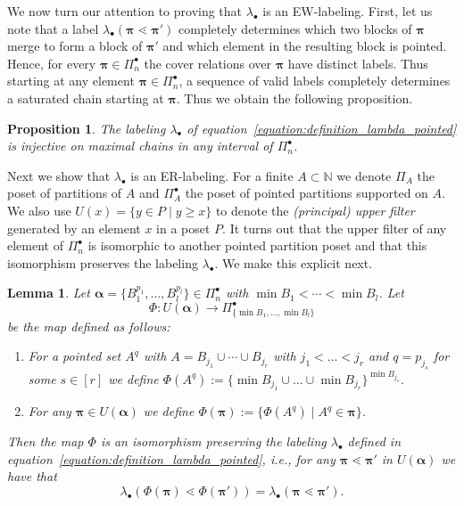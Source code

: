 \documentclass[11pt]{article}
\newtheorem{lemma}[theo]{Lemma}
\newtheorem{prop}[theo]{Proposition}
\theoremstyle{definition}
\numberwithin{equation}{section}
\newcommand{\NN}{\mathbb{N}}
\newcommand{\bpi}{\pmb{\pi}}
\newcommand{\balpha}{\pmb{\alpha}}
\begin{document}
 
  We now turn our attention to proving that $\lambda_\bullet$ is an EW-labeling.  First, let us note that a label $\lambda_{\bullet}(\bpi \lessdot \bpi')$ completely determines which two blocks of $\bpi$ merge to form a block of $\bpi'$ and which element in the resulting block is pointed. Hence, for every $\bpi\in \Pi_n^{\bullet}$ the cover relations over $\bpi$ have distinct labels. Thus starting at any element $\bpi \in \Pi_n^{\bullet}$, a sequence of valid labels completely determines a saturated chain starting at $\bpi$. Thus we obtain the following proposition.

\begin{prop} \label{proposition:injectivity_pointed} The labeling $\lambda_{\bullet}$ of equation~\eqref{equation:definition_lambda_pointed} is injective on maximal chains in any interval of $\Pi_n^{\bullet}$.
\end{prop}


Next we show that $\lambda_{\bullet}$ is an ER-labeling. 
For a finite $A\subset \NN$ we denote $\Pi_A$ the poset of partitions of $A$ and $\Pi_A^{\bullet}$ the poset of pointed partitions supported on $A$. We also use $U(x)=\{y\in P \mid y\geq x\}$ to denote the \emph{(principal) upper filter} generated by an element $x$ in a poset $P$.  It turns out that the upper filter of any element of $\Pi_n^\bullet$ is isomorphic to another pointed partition poset and that this isomorphism preserves the labeling $\lambda_\bullet$.  We make this explicit next.  


\begin{lemma}\label{lemma:isomorphism_pointed_upper_filters} Let $\balpha=\{B_1^{p_1},\dots, B_l^{p_l}\} \in \Pi_n^{\bullet}$ with $\min B_1< \cdots < \min B_l$. Let $$\Phi:U(\balpha)\rightarrow \Pi_{\{\min B_1, \dots, \min B_l\}}^{\bullet}$$ be the map defined as follows:
\begin{enumerate}
    \item For a pointed set $A^q$  with  $A=B_{j_1}\cup\cdots \cup B_{j_r}$ with $j_1<\dots<j_r$ and $q=p_{j_s}$ for some $s\in [r]$ we define $\Phi(A^q):=\{\min B_{j_1}\cup\dots \cup \min B_{j_r}\}^{\min B_{j_s}}$. 
    \item For any $\bpi \in U(\balpha)$ we define $\Phi(\bpi):=\{\Phi(A^q)\mid A^q \in \bpi\}$.
\end{enumerate}
Then the map $\Phi$ is an isomorphism  preserving the labeling $\lambda_{\bullet}$ defined in equation~\eqref{equation:definition_lambda_pointed}, i.e., for any $\bpi \lessdot \bpi'$ in $U(\balpha)$ we have that 
$$\lambda_{\bullet}(\Phi(\bpi) \lessdot \Phi(\bpi'))=\lambda_{\bullet}(\bpi \lessdot \bpi').$$
\end{lemma}
\end{document}
